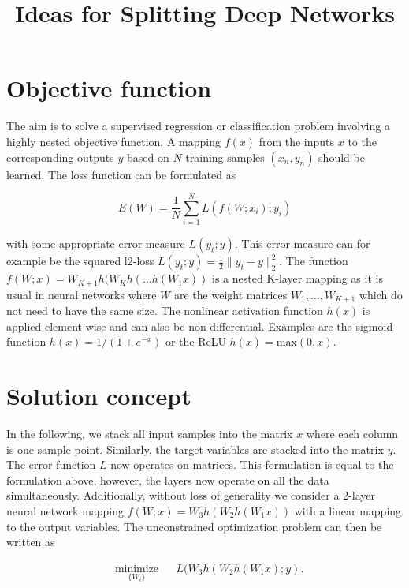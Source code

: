 \documentclass[english,11pt,a4paper]{article}
\title{Ideas for Splitting Deep Networks}
\author{}
\begin{document}
\maketitle

\section{Objective function}

The aim is to solve a supervised regression or classification problem involving a highly nested objective function. A mapping $f(x)$ from the inputs $x$ to the corresponding outputs $y$ based on $N$ training samples $(x_n, y_n)$ should be learned. The loss function can be formulated as

\begin{equation}
E(W) = \frac{1}{N} \sum_{i=1}^{N} L(f(W;x_i);y_i)
\label{eq:1}
\end{equation}

with some appropriate error measure $L(y_t;y)$. This error measure can for example be the squared l2-loss $L(y_t;y) = \frac{1}{2} \| y_t - y \|^2_2$. The function $f(W;x) = W_{K+1}h(W_Kh(\dots h(W_1x))$ is a nested K-layer mapping as it is usual in neural networks where $W$ are the weight matrices $W_1,\dots,W_{K+1}$ which do not need to have the same size. The nonlinear activation function $h(x)$ is applied element-wise and can also be non-differential. Examples are the sigmoid function $h(x) = 1/(1 + e^{-x})$ or the ReLU $h(x) = \mathrm{max}(0, x)$.

\section{Solution concept}

In the following, we stack all input samples into the matrix $x$ where each column is one sample point. Similarly, the target variables are stacked into the matrix $y$. The error function $L$ now operates on matrices. This formulation is equal to the formulation above, however, the layers now operate on all the data simultaneously. Additionally, without loss of generality we consider a 2-layer neural network mapping $f(W;x) = W_3h(W_2h(W_1x))$ with a linear mapping to the output variables. The unconstrained optimization problem can then be written as

\begin{equation}
	\begin{aligned}
		& \underset{\{W_i\}}{\text{minimize}}
		& & L(W_3h(W_2h(W_1x);y).
	\end{aligned}
\end{equation}
\end{document}
